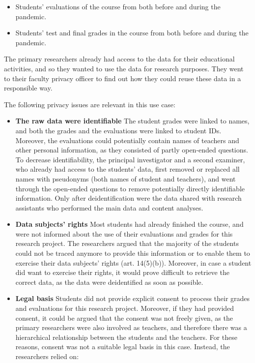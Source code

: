 \documentclass[
]{book}
\providecommand{\tightlist}{%
  \setlength{\itemsep}{0pt}\setlength{\parskip}{0pt}}
\begin{document}
\begin{itemize}
\tightlist
\item
  Students' evaluations of the course from both before and during the pandemic.
\item
  Students' test and final grades in the course from both before and during the pandemic.
\end{itemize}

The primary researchers already had access to the data for their educational
activities, and so they wanted to use the data for research purposes. They went
to their faculty privacy officer to find out how they could reuse these data in
a responsible way.

The following privacy issues are relevant in this use case:

\begin{itemize}
\tightlist
\item
  \textbf{The raw data were identifiable}
  The student grades were linked to names, and both the grades and the evaluations
  were linked to student IDs. Moreover, the evaluations could potentially contain
  names of teachers and other personal information, as they consisted of partly
  open-ended questions. To decrease identifiability, the principal investigator and
  a second examiner, who already had access to the students' data, first removed or
  replaced all names with pseudonyms (both names of student and teachers), and went
  through the open-ended questions to remove potentially directly identifiable
  information. Only after deidentification were the data shared with research
  assistants who performed the main data and content analyses.
\item
  \textbf{Data subjects' rights}
  Most students had already finished the course, and were not informed about the
  use of their evaluations and grades for this research project. The researchers
  argued that the majority of the students could not be traced anymore to provide
  this information or to enable them to exercise their data subjects' rights
  (art. 14(5)(b)).
  Moreover, in case a student did want to exercise their rights, it would prove
  difficult to retrieve the correct data, as the data were deidentified as soon as
  possible.
\item
  \textbf{Legal basis}
  Students did not provide explicit consent to process their grades and evaluations
  for this research project. Moreover, if they had provided consent, it could be
  argued that the consent was not freely given, as the primary researchers were
  also involved as teachers, and therefore there was a hierarchical relationship
  between the students and the teachers. For these reasons, consent was not a
  suitable legal basis in this case. Instead, the researchers relied on:


\end{itemize}
\end{document}

